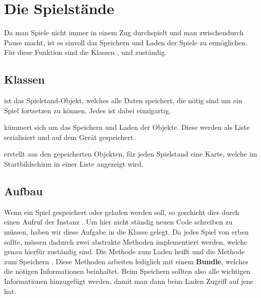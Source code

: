 \section{Die Spielstände}
\sectionauthor{\leonard}

Da man Spiele nicht immer in einem Zug durchspielt und man zwischendurch Pause 
macht, ist es sinvoll das Speichern und Laden der Spiele zu ermöglichen. Für 
diese Funktion sind die Klassen ,  
und  zuständig.

\subsection{Klassen}

ist das Spielstand-Objekt, welches alle Daten speichert, die nötig sind
um ein Spiel fortsetzen zu können. Jedes  ist dabei einzigartig.

kümmert sich um das Speichern und Laden der  Objekte. Diese
werden als Liste serialisiert und auf dem Gerät gespeichert.

erstellt aus den gepeicherten  Objekten, für jeden Spielstand eine
Karte, welche im Startbildschirm in einer Liste angezeigt wird.

\subsection{Aufbau}
Wenn ein Spiel gespeichert oder geladen werden soll, so geschieht dies durch einen 
Aufruf der Instanz . Um hier nicht ständig neuen Code
schreiben zu müssen, haben wir diese Aufgabe in die Klasse 
gelegt. Da jedes Spiel von  erben sollte, müssen dadurch zwei 
abstrakte Methoden implementiert werden, welche genau hierfür zuständig sind.
Die Methode zum Laden heißt  und die Methode zum Speichern 
. Diese Methoden arbeiten lediglich mit einem \textbf{Bundle}, 
welches die nötigen Informationen beinhaltet. Beim Speichern sollten also alle
wichtigen Informationen hinzugefügt werden, damit man dann beim Laden Zugriff
auf jene hat.
